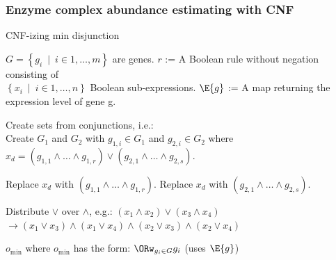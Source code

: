 \documentclass[compress]{beamer}
\begin{document}

\begin{frame}[fragile]
\frametitle{Enzyme complex abundance estimating with CNF}

\begin{algorithm}[H]
\scriptsize
\caption{CNF-izing min disjunction}
\label{alg:ReductionToCNF}
\begin{algorithmic}
\INPUT $G = \left\{g_i~\mid~i \in{1, \ldots, m}\right\}$ are genes. 
\INPUT $r$ := A Boolean rule without negation consisting of\\
  $\left\{x_i~\mid~i \in{1, \ldots, n}\right\}$ Boolean sub-expressions.
\INPUT $\E{g}$ := A map returning the expression level of gene g.
  \State \parbox[t]{\dimexpr\linewidth-\algorithmicindent}{
    Create sets from conjunctions, i.e.:\\
    Create $G_1$ and $G_2$ with $g_{1,i} \in G_1$ 
    and $g_{2,i} \in G_2$ where\\ 
    $x_d = (g_{1,1} \land \ldots \land g_{1,r}) \lor 
    (g_{2,1} \land \ldots \land g_{2,s})$. 
    \strut}
    \State Replace $x_d$ with $(g_{1,1} \land \ldots \land g_{1,r})$.
    \State Replace $x_d$ with $(g_{2,1} \land \ldots \land g_{2,s})$.
    \EndIf 
  \EndIf
  \State \parbox[t]{\dimexpr\linewidth-\algorithmicindent}{
    Distribute $\lor$ over $\land$, e.g.: $(x_1 \land x_2) \lor (x_3 \land x_4)$ \\ 
    $\rightarrow (x_1 \lor x_3) \land (x_1 \lor x_4) \land 
    (x_2 \lor x_3) \land (x_2 \lor x_4)$
    \strut}
\EndWhile
\OUTPUT $o_{\min}$ where $o_{\min}$ has the form: $\ORw_{g_i \in G} g_i$ (uses $\E{g}$)
\end{algorithmic} 
\end{algorithm}

\end{frame}

\end{document}
